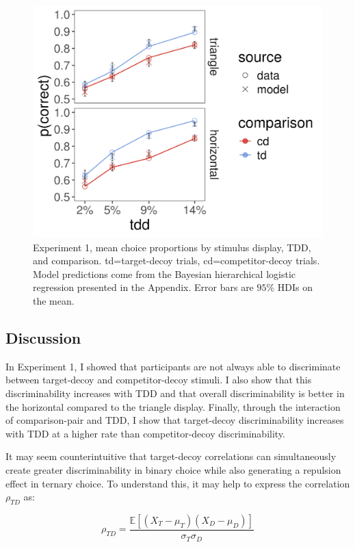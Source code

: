 \begin{figure}
   \includegraphics[width=\textwidth]{figures/m14_model_preds_v_data.jpeg}
   \caption{Experiment 1, mean choice proportions by stimulus display, TDD, and comparison. td=target-decoy trials, cd=competitor-decoy trials. Model predictions come from the Bayesian hierarchical logistic regression presented in the Appendix. Error bars are $95\%$ HDIs on the mean.}
   \label{fig:e1_data}
\end{figure}

\subsection{Discussion}
In Experiment 1, I showed that participants are not always able to discriminate between target-decoy and competitor-decoy stimuli. I also show that this discriminability increases with TDD and that overall discriminability is better in the horizontal compared to the triangle display. Finally, through the interaction of comparison-pair and TDD, I show that target-decoy discriminability increases with TDD at a higher rate than competitor-decoy discriminability. 

It may seem counterintuitive that target-decoy correlations can simultaneously create greater discriminability in binary choice while also generating a repulsion effect in ternary choice. To understand this, it may help to express the correlation $\rho_{TD}$ as:

\begin{equation}
   \rho_{TD}=\frac{\mathbb{E}[(X_{T}-\mu_{T})(X_{D}-\mu_{D})]}{\sigma_{T}\sigma_{D}}
   \label{eqn:rho_expectation}
\end{equation}

